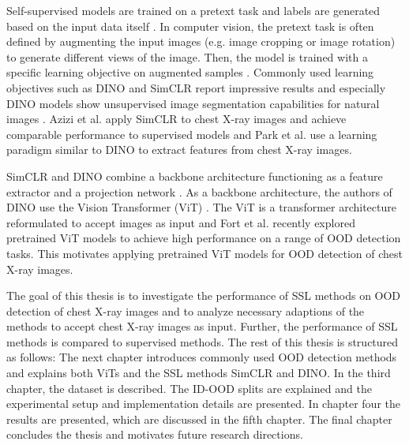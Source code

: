 Self-supervised models are trained on a pretext task and labels are generated based on the input data itself \citep{Jaiswal2021}.
In computer vision, the pretext task is often defined by augmenting the input images (e.g. image cropping or image rotation) to generate different views of the image.
Then, the model is trained with a specific learning objective on augmented samples \citep{Jaiswal2020}.
Commonly used learning objectives such as DINO \citep{Caron2021} and SimCLR \citep{Chen2020} report impressive results and especially DINO models show unsupervised image segmentation capabilities for natural images \citep{Caron2021}.
Azizi et al. \citep{Azizi2021} apply SimCLR to chest X-ray images and achieve comparable performance to supervised models and Park et al. \citep{Park2022} use a learning paradigm similar to DINO to extract features from chest X-ray images.
\par
SimCLR and DINO combine a backbone architecture functioning as a feature extractor and a projection network \citep{Caron2021,Chen2020}. 
As a backbone architecture, the authors of DINO use the Vision Transformer (ViT) \citep{Caron2021}.
The ViT is a transformer architecture \citep{Vaswani2017} reformulated to accept images as input \citep{Dosovitskiy2020} and Fort et al. \citep{Fort2021} recently explored pretrained ViT models to achieve high performance on a range of OOD detection tasks.
This motivates applying pretrained ViT models for OOD detection of chest X-ray images.
\par
The goal of this thesis is to investigate the performance of SSL methods on OOD detection of chest X-ray images and to analyze necessary adaptions of the methods to accept chest X-ray images as input.
Further, the performance of SSL methods is compared to supervised methods.
The rest of this thesis is structured as follows: The next chapter introduces commonly used OOD detection methods and explains both ViTs and the SSL methods SimCLR and DINO.
In the third chapter, the dataset is described.
The ID-OOD splits are explained and the experimental setup and implementation details are presented.
In chapter four the results are presented, which are discussed in the fifth chapter.
The final chapter concludes the thesis and motivates future research directions.
